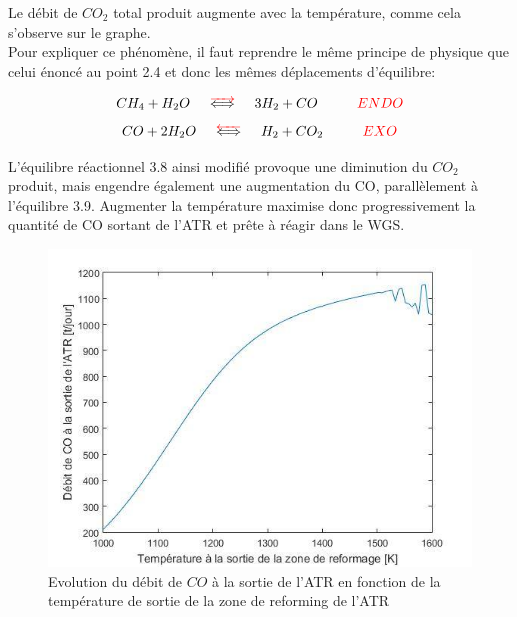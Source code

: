 \documentclass[12pt]{report}
\begin{document}
Le débit de $CO_2$ total produit augmente avec la température, comme cela s'observe sur le graphe.\\

Pour expliquer ce phénomène, il faut reprendre le même principe de physique que celui énoncé au point 2.4 et donc les mêmes déplacements d'équilibre:

 \begin{equation}
 CH_4 + H_2O \hspace{0.5cm}\textcolor{red}{\overrightarrow{\textcolor{black}{\Longleftrightarrow}}} \hspace{0.5cm} 3H_2 + CO \hspace{1cm}\textcolor{red}{ENDO}
 \end{equation}
 \begin{equation}
 CO + 2H_2O \hspace{0.5cm}\textcolor{red}{\overleftarrow{\textcolor{black}{\Longleftrightarrow}}} \hspace{0.5cm} H_2 + CO_2 \hspace{1cm}\textcolor{red}{EXO}
 \end{equation}
 
 L'équilibre réactionnel 3.8 ainsi modifié provoque une diminution du $CO_2$ produit, mais engendre également une augmentation du CO, parallèlement à l'équilibre 3.9. Augmenter la température maximise donc progressivement la quantité de CO sortant de l'ATR et prête à réagir dans le WGS.\\
 
 \begin{figure}[H]
\begin{center}
\includegraphics[scale=0.6]{debit_CO_ATR_Temperature}
\caption{Evolution du débit de $CO$ à la sortie de l'ATR en fonction de la température de sortie de la zone de reforming de l'ATR}
\end{center}
\end{figure}
\end{document}

